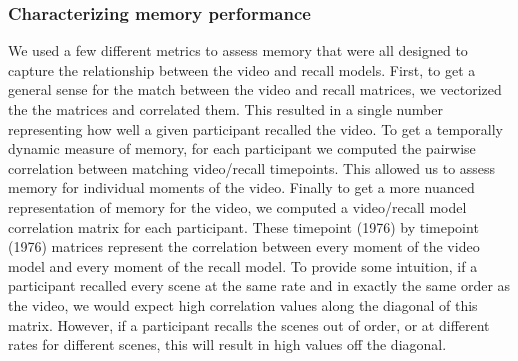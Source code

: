 \documentclass[a4paper,man,natbib,floatsintext]{apa6}
\begin{document}
\subsubsection{Characterizing memory performance}
We used a few different metrics to assess memory that were all designed to capture the relationship between the video and recall models.  First, to get a general sense for the match between the video and recall matrices, we vectorized the the matrices and correlated them.  This resulted in a single number representing how well a given participant recalled the video. To get a temporally dynamic measure of memory, for each participant we computed the pairwise correlation between matching video/recall timepoints.  This allowed us to assess memory for individual moments of the video. Finally to get a more nuanced representation of memory for the video, we computed a video/recall model correlation matrix for each participant. These timepoint (1976) by timepoint (1976) matrices represent the correlation between every moment of the video model and every moment of the recall model. To provide some intuition, if a participant recalled every scene at the same rate and in exactly the same order as the video, we would expect high correlation values along the diagonal of this matrix. However, if a participant recalls the scenes out of order, or at different rates for different scenes, this will result in high values off the diagonal.
\end{document}
